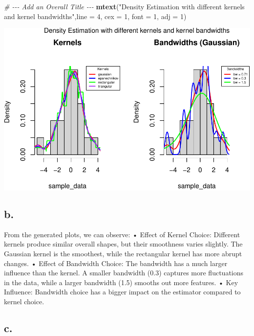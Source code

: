 \documentclass[
]{article}
\newenvironment{Shaded}{\begin{snugshade}}{\end{snugshade}}
\newcommand{\AttributeTok}[1]{\textcolor[rgb]{0.13,0.29,0.53}{#1}}
\newcommand{\CommentTok}[1]{\textcolor[rgb]{0.56,0.35,0.01}{\textit{#1}}}
\newcommand{\DecValTok}[1]{\textcolor[rgb]{0.00,0.00,0.81}{#1}}
\newcommand{\FunctionTok}[1]{\textcolor[rgb]{0.13,0.29,0.53}{\textbf{#1}}}
\newcommand{\NormalTok}[1]{#1}
\newcommand{\StringTok}[1]{\textcolor[rgb]{0.31,0.60,0.02}{#1}}
\begin{document}
\begin{Shaded}
\begin{Highlighting}[]
\CommentTok{\# {-}{-}{-} Add an Overall Title {-}{-}{-}}
\FunctionTok{mtext}\NormalTok{(}\StringTok{"Density Estimation with different kernels and kernel bandwidths"}\NormalTok{,}\AttributeTok{line =} \DecValTok{4}\NormalTok{, }\AttributeTok{cex =} \DecValTok{1}\NormalTok{, }\AttributeTok{font =} \DecValTok{1}\NormalTok{, }\AttributeTok{adj =} \DecValTok{1}\NormalTok{)}
\end{Highlighting}
\end{Shaded}

\includegraphics{SDA_submission_template_files/figure-latex/unnamed-chunk-1-1.pdf}

\subsection{b.}\label{b.}

From the generated plots, we can observe: • Effect of Kernel Choice:
Different kernels produce similar overall shapes, but their smoothness
varies slightly. The Gaussian kernel is the smoothest, while the
rectangular kernel has more abrupt changes. • Effect of Bandwidth
Choice: The bandwidth has a much larger influence than the kernel. A
smaller bandwidth (0.3) captures more fluctuations in the data, while a
larger bandwidth (1.5) smooths out more features. • Key Influence:
Bandwidth choice has a bigger impact on the estimator compared to kernel
choice.

\subsection{c.}\label{c.}
\end{document}

